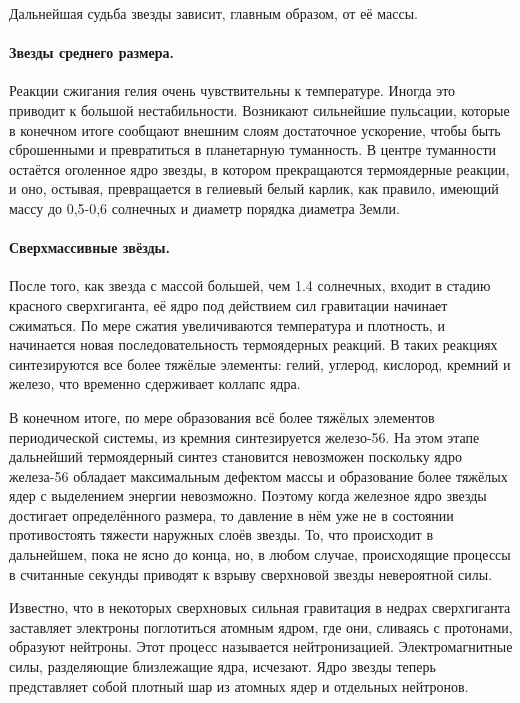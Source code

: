 \documentclass[a4paper, 12pt]{extarticle}
\begin{document}
  Дальнейшая судьба звезды зависит, главным образом, от её массы.

  \paragraph{Звезды среднего размера.} Реакции сжигания гелия очень чувствительны к температуре.
  Иногда это приводит к большой нестабильности. Возникают сильнейшие пульсации, которые в конечном
  итоге сообщают внешним слоям достаточное ускорение, чтобы быть сброшенными и превратиться в
  планетарную туманность. В центре туманности остаётся оголенное ядро звезды, в котором прекращаются
  термоядерные реакции, и оно, остывая, превращается в гелиевый белый карлик, как правило, имеющий
  массу до 0,5-0,6 солнечных и диаметр порядка диаметра Земли.

  \paragraph{Сверхмассивные звёзды.} После того, как звезда с массой большей, чем 1.4 солнечных,
  входит в стадию красного сверхгиганта, её ядро под действием сил гравитации начинает сжиматься. По
  мере сжатия увеличиваются температура и плотность, и начинается новая последовательность
  термоядерных реакций. В таких реакциях синтезируются все более тяжёлые элементы: гелий, углерод,
  кислород, кремний и железо, что временно сдерживает коллапс ядра.

  В конечном итоге, по мере образования всё более тяжёлых элементов периодической системы, из
  кремния синтезируется железо-56. На этом этапе дальнейший термоядерный синтез становится
  невозможен поскольку ядро железа-56 обладает максимальным дефектом массы и образование более
  тяжёлых ядер с выделением энергии невозможно. Поэтому когда железное ядро звезды достигает
  определённого размера, то давление в нём уже не в состоянии противостоять тяжести наружных слоёв
  звезды.  То, что происходит в дальнейшем, пока не ясно до конца, но, в любом случае, происходящие
  процессы в считанные секунды приводят к взрыву сверхновой звезды невероятной силы.

  Известно, что в некоторых сверхновых сильная гравитация в недрах сверхгиганта заставляет электроны
  поглотиться атомным ядром, где они, сливаясь с протонами, образуют нейтроны. Этот процесс
  называется нейтронизацией. Электромагнитные силы, разделяющие близлежащие ядра, исчезают. Ядро
  звезды теперь представляет собой плотный шар из атомных ядер и отдельных нейтронов.
\end{document}
